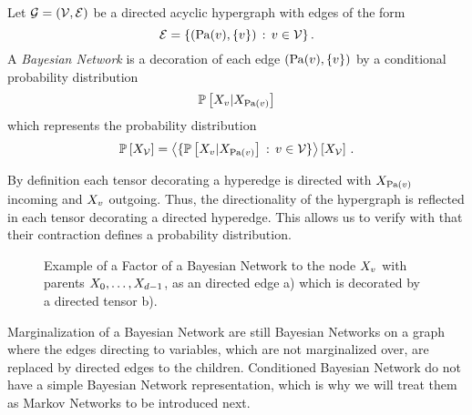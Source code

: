 \begin{definition}
    \label{def:bayesianNetwork}
    Let $\mathcal{G}=(\mathcal{V},\mathcal{E})$ be a directed acyclic hypergraph with edges of the form
    \[ \mathcal{E} = \{(\mathrm{Pa}(v),\{v\}) \, : \, v\in\mathcal{V}\} \, . \]
    A \emph{Bayesian Network} is a decoration of each edge $(\mathrm{Pa}(v),\{v\})$ by a conditional probability distribution
    \[ \mathbb{P}\left[X_{v}|X_{\mathrm{Pa}(v)}\right] \]
    which represents the probability distribution
    \begin{align*}
        \mathbb{P}\left[X_{\mathcal{V}}\right] = \left\langle \{\mathbb{P}\left[X_{v}|X_{\mathrm{Pa}(v)}\right] \, : \, v\in\mathcal{V}\}\right\rangle \left[ X_{\mathcal{V}} \right] \, .
    \end{align*}
\end{definition}

%
By definition each tensor decorating a hyperedge is directed with $X_{\mathrm{Pa}(v)}$ incoming and $X_{v}$ outgoing.
Thus, the directionality of the hypergraph is reflected in each tensor decorating a directed hyperedge.
This allows us to verify with  that their contraction defines a probability distribution.



\begin{figure}[h]
    \begin{center}
        
    \end{center}
    \caption{Example of a Factor of a Bayesian Network to the node $X_{v}$ with parents $X_{0},\ldots,X_{d-1}$, as an directed edge a) which is decorated by a directed tensor b).}
    \label{fig:BayesianFactor}
\end{figure}


Marginalization of a Bayesian Network are still Bayesian Networks on a graph where the edges directing to variables, which are not marginalized over, are replaced by directed edges to the children.
Conditioned Bayesian Network do not have a simple Bayesian Network representation, which is why we will treat them as Markov Networks to be introduced next.


